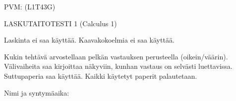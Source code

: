 \documentclass[finnish, a4paper, 12pt]{article}
\begin{document}
	
	
		PVM: \underline{\phantom{mm.mm.}}
		\hfill
		(L1T43G)	%
	
	\begin{center}
		{\large
			LASKUTAITOTESTI 1 (Calculus 1)}
	\end{center}
	
	Laskinta ei saa käyttää. Kaavakokoelmia ei saa käyttää.
	
	Kukin tehtävä arvostellaan pelkän vastauksen perusteella (oikein/väärin).
	Välivaiheita saa kirjoittaa näkyviin, kunhan vastaus on selvästi luettavissa.
	Suttupaperia saa käyttää. Kaikki käytetyt paperit palautetaan.
	
\vspace{12pt}
Nimi ja syntymäaika: \phantom{m} \hrulefill
\vspace{8pt}
	
\end{document}
